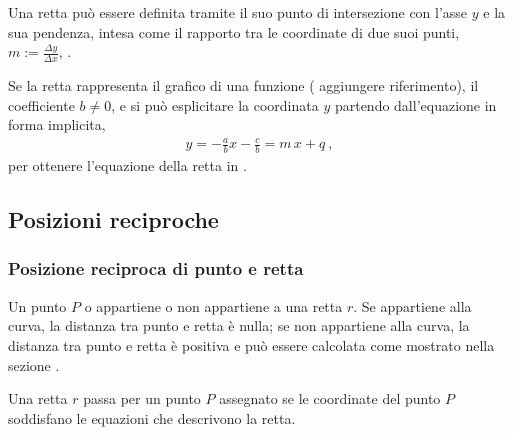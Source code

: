 \documentclass[letterpaper,10pt,english]{jupyterBook}
\begin{document}
\sphinxAtStartPar
{} Una retta può essere definita tramite il suo punto di intersezione  con l’asse \(y\) e la sua pendenza, intesa come il rapporto tra le coordinate di due suoi punti, \(m := \frac{\Delta y}{\Delta x}\), .

\sphinxAtStartPar
Se la retta  rappresenta il grafico di una funzione ( aggiungere riferimento), il coefficiente \(b \ne 0\), e si può esplicitare la coordinata \(y\) partendo dall’equazione in forma implicita,
\begin{equation*}
\begin{split}y = -\frac{a}{b} x - \frac{c}{b} = m \, x + q \ ,\end{split}
\end{equation*}
\sphinxAtStartPar
per ottenere l’equazione della retta in .


\subsection{Posizioni reciproche}
\label{\detokenize{ch/analytic_geometry/analytic_geometry_2d/lines:posizioni-reciproche}}

\subsubsection{Posizione reciproca di punto e retta}
\label{\detokenize{ch/analytic_geometry/analytic_geometry_2d/lines:posizione-reciproca-di-punto-e-retta}}
\sphinxAtStartPar
Un punto \(P\) o appartiene o non appartiene a una retta \(r\). Se appartiene alla curva, la distanza tra punto e retta è nulla; se non appartiene alla curva, la distanza tra punto e retta è positiva e può essere calcolata come mostrato nella sezione {\hyperref[\detokenize{ch/analytic_geometry/analytic_geometry_2d/lines:geometry-analytic-2d-lines-distance-point-line}]{}}.

\sphinxAtStartPar
{} Una retta \(r\) passa per un punto \(P\) assegnato se le coordinate del punto \(P\) soddisfano le equazioni che descrivono la retta.
\end{document}
